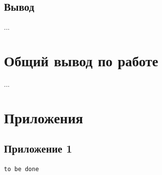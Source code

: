 \documentclass[a4paper, 12pt]{article}
\begin{document}
    \subsection{Вывод}
    ...


    \section{Общий вывод по работе}
    ...


    \section{Приложения}
    \subsection{Приложение 1}
    \begin{lstlisting}[label=task1code, caption={Программа для задания 1}]
        to be done
    \end{lstlisting}
\end{document}
